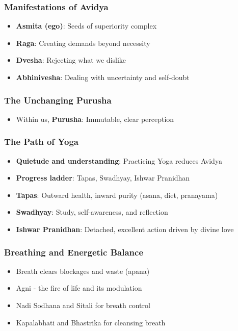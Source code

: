 \begin{frame}[fragile]\frametitle{Manifestations of Avidya}
  \begin{itemize}
    \item \textbf{Asmita (ego)}: Seeds of superiority complex
    \item \textbf{Raga}: Creating demands beyond necessity
    \item \textbf{Dvesha}: Rejecting what we dislike
    \item \textbf{Abhinivesha}: Dealing with uncertainty and self-doubt
  \end{itemize}
\end{frame}

\begin{frame}[fragile]\frametitle{The Unchanging Purusha}
  \begin{itemize}
    \item Within us, \textbf{Purusha}: Immutable, clear perception
  \end{itemize}
\end{frame}

\begin{frame}[fragile]\frametitle{The Path of Yoga}
  \begin{itemize}
    \item \textbf{Quietude and understanding}: Practicing Yoga reduces Avidya
    \item \textbf{Progress ladder}: Tapas, Swadhyay, Ishwar Pranidhan
    \item \textbf{Tapas}: Outward health, inward purity (asana, diet, pranayama)
    \item \textbf{Swadhyay}: Study, self-awareness, and reflection
    \item \textbf{Ishwar Pranidhan}: Detached, excellent action driven by divine love
  \end{itemize}
\end{frame}

\begin{frame}[fragile]\frametitle{Breathing and Energetic Balance}
\begin{itemize}
\item Breath clears blockages and waste (apana)
\item Agni - the fire of life and its modulation
\item Nadi Sodhana and Sitali for breath control
\item Kapalabhati and Bhastrika for cleansing breath
\end{itemize}
\end{frame}

